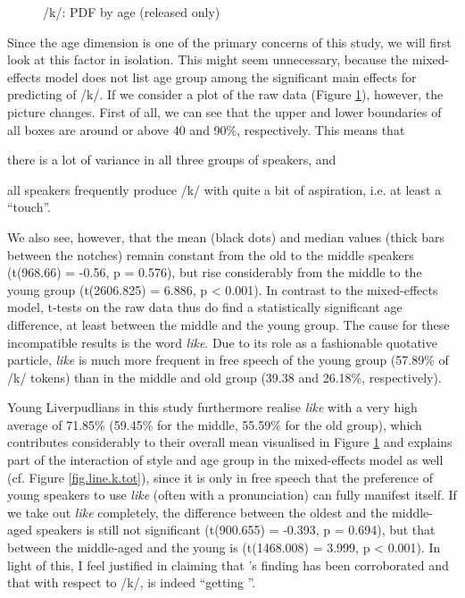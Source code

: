 \begin{figure}[h]
	\centering
		\resizebox{0.5\linewidth}{!}{} 
	\caption{/k/: PDF by age (released only)}
	\label{fig.box.k.tot}
\end{figure}

Since the age dimension is one of the primary concerns of this study, we will first look at this factor in isolation.
This might seem unnecessary, because the mixed-effects model does not list age group among the significant main effects for predicting  of /k/.
If we consider a plot of the raw data (Figure \ref{fig.box.k.tot}), however, the picture changes.
First of all, we can see that the upper and lower boundaries of all boxes are around or above 40 and 90\%, respectively.
This means that
\begin{inparaenum}[(a)]
	\item there is a lot of variance in all three groups of speakers, and
	\item all speakers frequently produce /k/ with quite a bit of aspiration, i.e. at least a  ``touch''.
\end{inparaenum}
We also see, however, that the mean (black dots) and median values (thick bars between the notches) remain constant from the old to the middle speakers (t(968.66) = -0.56, p = 0.576), but rise considerably from the middle to the young group (t(2606.825) = 6.886, p < 0.001).
In contrast to the mixed-effects model, t-tests on the raw data thus do find a statistically significant age difference, at least between the middle and the young group.
The cause for these incompatible results is the word \emph{like}.
Due to its role as a fashionable quotative particle, \emph{like} is much more frequent in free speech of the young group (57.89\% of /k/ tokens) than in the middle and old group (39.38 and 26.18\%, respectively).

Young Liverpudlians in this study furthermore realise \emph{like} with a very high average  of 71.85\% (59.45\% for the middle, 55.59\% for the old group), which contributes considerably to their overall mean visualised in Figure \ref{fig.box.k.tot} and explains part of the interaction of style and age group in the mixed-effects model as well (cf. Figure \ref{fig.line.k.tot}), since it is only in free speech that the preference of young speakers to use \emph{like} (often with a  pronunciation) can fully manifest itself.
If we take out \emph{like} completely, the difference between the oldest and the middle-aged speakers is still not significant (t(900.655) = -0.393, p = 0.694), but that between the middle-aged and the young is (t(1468.008) = 3.999, p < 0.001).
In light of this, I feel justified in claiming that \citeauthor{watson2007a}'s \citeyearpar{watson2007a} finding has been corroborated and that with respect to /k/,  is indeed ``getting ''.

